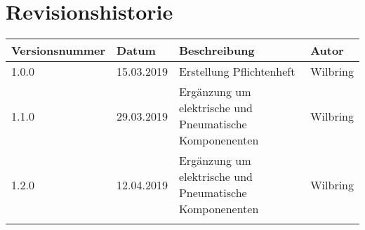 \section*{Revisionshistorie}

\begin{tabular}{|p{3cm}|p{2cm}|p{5.5cm}|p{2cm}|}
\hline
Versionsnummer  & Datum         & Beschreibung          & Autor     \\
\hline
 1.0.0          & 15.03.2019    & Erstellung Pflichtenheft & Wilbring  \\\hline
 1.1.0          & 29.03.2019    & Ergänzung um elektrische und Pneumatische Komponenenten & Wilbring \\\hline
 1.2.0           & 12.04.2019   & Ergänzung um elektrische und Pneumatische Komponenenten & Wilbring  \\\hline
                 &               &                       &           \\\hline
\end{tabular}
